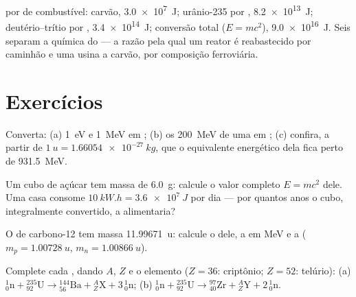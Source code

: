 \begin{example}\label{ex:g12:nuclear-energy:ladder}
 por  de combustível: carvão, \qty{3.0e7}{J}; urânio-235 por ,
\qty{8.2e13}{J}; deutério--trítio por , \qty{3.4e14}{J}; conversão total
($E = mc^2$), \qty{9.0e16}{J}. Seis  separam a química do  --- a
razão pela qual um reator é reabastecido por caminhão e uma usina a carvão, por
composição ferroviária.
\end{example}

\section{Exercícios}

\begin{exercise}[$\star$]\label{exo:g12:nuclear-energy:1}
Converta: (a) \qty{1}{eV} e \qty{1}{MeV} em ; (b) os \qty{200}{MeV} de uma 
em ; (c) confira, a partir de $\qty{1}{u} = \qty{1.66054e-27}{kg}$, que o
equivalente energético dela fica perto de \qty{931.5}{MeV}.
\end{exercise}

\begin{exercise}[$\star$]\label{exo:g12:nuclear-energy:2}
Um cubo de açúcar tem massa de \qty{6.0}{g}: calcule o valor completo $E = mc^2$ dele.
Uma casa consome $\qty{10}{kW.h} = \qty{3.6e7}{J}$ por dia --- por quantos anos o cubo,
integralmente convertido, a alimentaria?
\end{exercise}

\begin{exercise}[$\star$]\label{exo:g12:nuclear-energy:3}
O  de carbono-12 tem massa \qty{11.99671}{u}: calcule o  dele, a
 em \unit{MeV} e a 
($m_p = \qty{1.00728}{u}$, $m_n = \qty{1.00866}{u}$).
\end{exercise}

\begin{exercise}[$\star$]\label{exo:g12:nuclear-energy:4}
Complete cada , dando $A$, $Z$ e o elemento ($Z = 36$: criptônio; $Z = 52$:
telúrio):
(a) ${}^{1}_{0}\mathrm{n} + {}^{235}_{92}\mathrm{U} \to
{}^{144}_{56}\mathrm{Ba} + {}^{A}_{Z}\mathrm{X} + 3\,{}^{1}_{0}\mathrm{n}$;
(b) ${}^{1}_{0}\mathrm{n} + {}^{235}_{92}\mathrm{U} \to
{}^{97}_{40}\mathrm{Zr} + {}^{A}_{Z}\mathrm{Y} + 2\,{}^{1}_{0}\mathrm{n}$.
\end{exercise}

